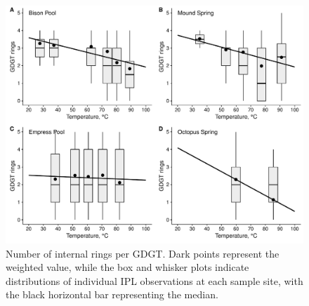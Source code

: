 \singlespace
\begin{figure}[h]
\centering
\includegraphics[width=1\linewidth]{"figs_ch1/boxplot - alkyl chain nRings"}
\caption[Number of internal rings per GDGT]{Number of internal rings per GDGT. Dark points represent the weighted value, while the box and whisker plots indicate distributions of individual IPL observations at each sample site, with the black horizontal bar representing the median.}
\label{fig:nRings}
\end{figure}
\doublespace